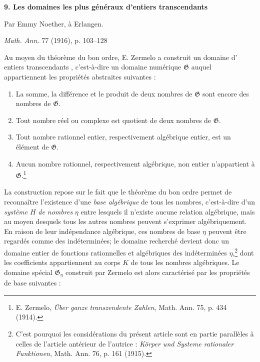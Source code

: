\begin{center}
{\Large\bfseries 9. Les domaines les plus généraux d'entiers transcendants}\par
\vspace{0.75em}
Par Emmy Noether, à Erlangen.\par
\vspace{1.2em}
\emph{Math. Ann.} 77 (1916), p. 103--128
\end{center}

\vspace{1.5em}

Au moyen du théorème du bon ordre, E. Zermelo a construit un domaine d'\og{} entiers transcendants \fg{}, c'est-à-dire un domaine numérique $\mathfrak G$ auquel appartiennent les propriétés abstraites suivantes :
\begin{enumerate}
\item[I.] La somme, la différence et le produit de deux nombres de $\mathfrak G$ sont encore des nombres de $\mathfrak G$.
\item[II.] Tout nombre réel ou complexe est quotient de deux nombres de $\mathfrak G$.
\item[III.] Tout nombre rationnel entier, respectivement algébrique entier, est un élément de $\mathfrak G$.
\item[IV.] Aucun nombre rationnel, respectivement algébrique, non entier n'appartient à $\mathfrak G$.\footnote{E. Zermelo, \emph{Über ganze transzendente Zahlen}, Math. Ann. 75, p. 434 (1914).}
\end{enumerate}

La construction repose sur le fait que le théorème du bon ordre permet de reconnaître l'existence d'une \emph{base algébrique} de tous les nombres, c'est-à-dire d'un \emph{système} $H$ \emph{de nombres} $\eta$ entre lesquels il n'existe aucune relation algébrique, mais au moyen desquels tous les autres nombres peuvent s'exprimer algébriquement. En raison de leur indépendance algébrique, ces nombres de base $\eta$ peuvent être regardés comme des indéterminées; le domaine recherché devient donc un domaine entier de fonctions rationnelles et algébriques des indéterminées $\eta$,\footnote{C'est pourquoi les considérations du présent article sont en partie parallèles à celles de l'article antérieur de l'autrice : \emph{Körper und Systeme rationaler Funktionen}, Math. Ann. 76, p. 161 (1915).} dont les coefficients appartiennent au corps $K$ de tous les nombres algébriques. Le domaine spécial $\mathfrak G_\eta$ construit par Zermelo est alors caractérisé par les propriétés de base suivantes :


